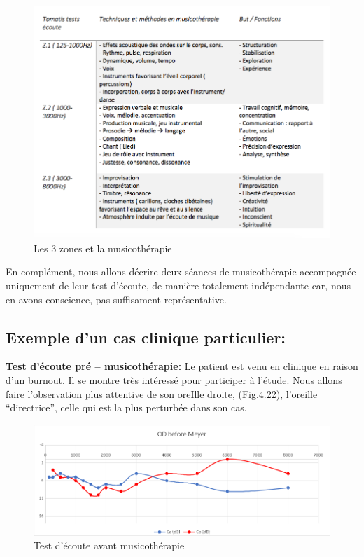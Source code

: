 \begin{figure}[tbh]
	\centering
	\includegraphics[width=1\linewidth]{images/testtechnmethbut}
	\caption[Zones du test avec la musicothérapie]{Les 3
          zones et la musicothérapie}

	\label{testbutetfonction}
\end{figure}



En complément, nous allons décrire deux séances de
musicothérapie accompagnée uniquement de leur test d'écoute, de
manière totalement indépendante car, nous en avons conscience, pas
suffisament représentative.

\subsection{Exemple d'un cas clinique particulier:}

\textbf{ Test d'écoute pré -- musicothérapie:}
 	Le patient est venu en clinique en raison d'un burnout. Il se montre très
        intéressé pour participer à l'étude. Nous allons faire
        l'observation plus attentive de
        son oreIlle droite, (Fig.4.22), l'oreille ``directrice'',
        celle qui est la plus perturbée dans son cas.


 	\begin{figure}[tbh]
 		\centering
 		\includegraphics[width=0.7\linewidth]{images/clinique/od_before_meyer.png}
 		\caption{Test d'écoute avant musicothérapie}
 		\label{fig:odbeforemeyer}
 	\end{figure}



